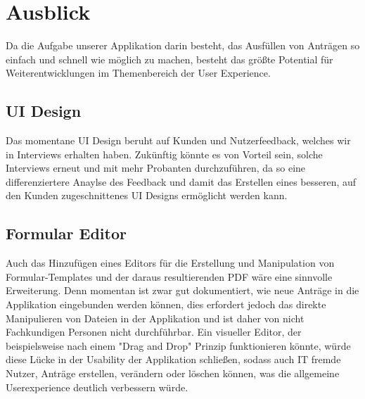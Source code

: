 \chapter{Ausblick}\label{ch:ausblick}

Da die Aufgabe unserer Applikation darin besteht, das Ausfüllen von Anträgen so einfach 
und schnell wie möglich zu machen, besteht das größte Potential für Weiterentwicklungen
im Themenbereich der User Experience.

\section{\ac{UI} Design}\label{sec: ui design}
Das momentane \ac{UI} Design beruht auf Kunden und Nutzerfeedback, welches wir in 
Interviews erhalten haben. Zukünftig könnte es von Vorteil sein, solche Interviews 
erneut und mit mehr Probanten durchzuführen, da so eine differenziertere Anaylse
des Feedback und damit das Erstellen eines besseren, auf den Kunden zugeschnittenes \ac{UI} 
Designs ermöglicht werden kann.%

\section{Formular Editor}\label{sec: formular editor}
Auch das Hinzufügen eines Editors für die Erstellung und Manipulation von 
Formular-Templates und der daraus resultierenden PDF wäre eine sinnvolle Erweiterung. Denn 
momentan ist zwar gut dokumentiert, wie neue Anträge in die Applikation eingebunden werden 
können, dies erfordert jedoch das direkte Manipulieren von Dateien in der Applikation 
und ist daher von nicht Fachkundigen Personen nicht durchführbar. Ein visueller Editor, der 
beispielsweise nach einem "Drag and Drop" Prinzip funktionieren könnte, würde diese Lücke 
in der Usability der Applikation schließen, sodass auch IT fremde Nutzer, Anträge 
erstellen, verändern oder löschen können, was die allgemeine Userexperience deutlich 
verbessern würde.